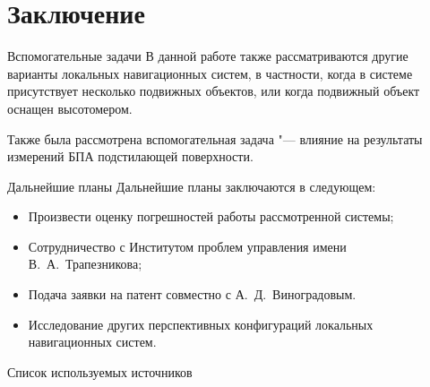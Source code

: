 \documentclass[russian,hyperref={unicode}]{beamer}
\begin{document}
  \section{Заключение}

  \begin{frame}{Вспомогательные задачи}
    В данной работе также рассматриваются другие варианты локальных навигационных систем, в частности, когда в системе присутствует несколько подвижных объектов, или когда подвижный объект оснащен высотомером.

    Также была рассмотрена вспомогательная задача "--- влияние на результаты измерений БПА подстилающей поверхности.
  \end{frame}

  \begin{frame}{Дальнейшие планы}
    Дальнейшие планы заключаются в следующем:
    \begin{itemize}
      \item Произвести оценку погрешностей работы рассмотренной системы;
      \item Сотрудничество с Институтом проблем управления имени В.~А.~Трапезникова;
      \item Подача заявки на патент совместно с А.~Д.~Виноградовым.
      \item Исследование других перспективных конфигураций локальных навигационных систем.
    \end{itemize}
  \end{frame}

  \begin{frame}[allowframebreaks]{Список используемых источников}
    \printbibliography
  \end{frame}

  \frame{\titlepage}
\end{document}
